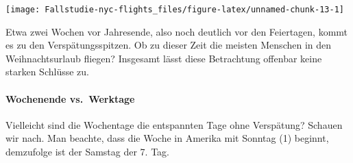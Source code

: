 \documentclass[]{article}
\newenvironment{Shaded}{\begin{snugshade}}{\end{snugshade}}
\newcommand{\CommentTok}[1]{\textcolor[rgb]{0.56,0.35,0.01}{\textit{#1}}}
\newcommand{\DataTypeTok}[1]{\textcolor[rgb]{0.13,0.29,0.53}{#1}}
\newcommand{\DecValTok}[1]{\textcolor[rgb]{0.00,0.00,0.81}{#1}}
\newcommand{\KeywordTok}[1]{\textcolor[rgb]{0.13,0.29,0.53}{\textbf{#1}}}
\newcommand{\NormalTok}[1]{#1}
\newcommand{\OperatorTok}[1]{\textcolor[rgb]{0.81,0.36,0.00}{\textbf{#1}}}
\newcommand{\OtherTok}[1]{\textcolor[rgb]{0.56,0.35,0.01}{#1}}
\newcommand{\StringTok}[1]{\textcolor[rgb]{0.31,0.60,0.02}{#1}}
\let\oldparagraph\paragraph
\renewcommand{\paragraph}[1]{\oldparagraph{#1}\mbox{}}
\begin{document}
\begin{Shaded}
\end{Shaded}

\begin{center}\texttt{[image: Fallstudie-nyc-flights\_files/figure-latex/unnamed-chunk-13-1]} \end{center}

Etwa zwei Wochen vor Jahresende, also noch deutlich vor den Feiertagen,
kommt es zu den Verspätungsspitzen. Ob zu dieser Zeit die meisten
Menschen in den Weihnachtsurlaub fliegen? Insgesamt lässt diese
Betrachtung offenbar keine starken Schlüsse zu.

\hypertarget{wochenende-vs.-werktage}{%
\paragraph{Wochenende vs.~Werktage}\label{wochenende-vs.-werktage}}

Vielleicht sind die Wochentage die entspannten Tage ohne Verspätung?
Schauen wir nach. Man beachte, dass die Woche in Amerika mit Sonntag (1)
beginnt, demzufolge ist der Samstag der 7. Tag.

\begin{Shaded}
\end{Shaded}
\end{document}
